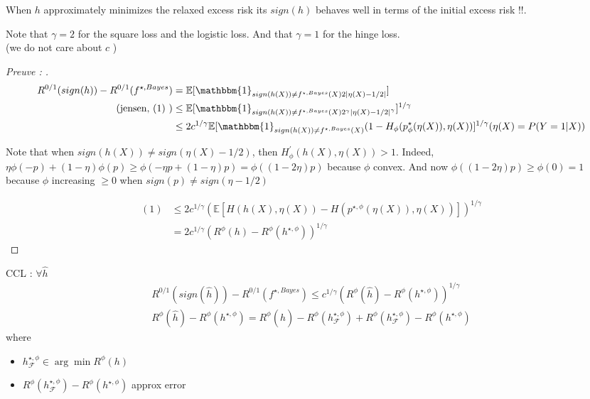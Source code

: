 When $ h $ approximately minimizes the relaxed excess risk its $ sign(h) $ behaves well in terms of the initial excess risk !!. 

\begin{note}[]
    Note that $ \gamma = 2 $  for the square loss and the logistic loss. And that $ \gamma = 1 $ for the hinge loss. \\
    (we do not care about $ c $ )
\end{note}

\begin{proof}[Preuve : ]
    \begin{align*}
        R^{0/1} (sign(h)) - R^{0/1}(f^{\star , Bayes }) &= \mathbb{E}[ \mathbbm{1}_{sign(h(X)) \neq  f^{\star , Bayes}(X) 2  \left| \eta (X) - 1/2 \right| }] \\
        \text{(jensen, (1) )} &\leq \mathbb{E}[ \mathbbm{1}_{sign(h(X)) \neq  f^{\star , Bayes}(X) 2^\gamma  \left| \eta (X) - 1/2 \right| ^\gamma }]^{1/\gamma } \\
                        &\leq 2 c^{1/\gamma } \mathbb{E}[\mathbbm{1}_{sign(h(X)) \neq  f^{\star , Bayes}(X) } (1 - H_ \phi (p^\star _\phi  (\eta (X)) , \eta (X))]^{1/\gamma} (\eta (X) = P (Y=1 | X))
    \end{align*}
    \begin{note}[]
        Note that when $ sign(h(X)) \neq sign(\eta (X) - 1/2) $, then $ H_\phi ^\prime ( h(X), \eta (X) ) > 1 $. Indeed, $ \eta \phi (-p) + (1 - \eta ) \phi (p) \geq \phi ( - \eta  p + (1 - \eta ) p) = \phi ((1 - 2 \eta ) p )$ because $ \phi  $ convex. And now $ \phi ((1 - 2 \eta ) p) \geq  \phi (0) = 1 $ because $ \phi  $ increasing $ \geq 0 $ when $ sign(p) \neq sign(\eta - 1/2) $ 
    \end{note}
    
    \begin{align*}
        (1) &\leq  2 c^{1/\gamma } ( \mathbb{E} [ H( h(X), \eta (X)) - H(p^{\star , \phi }(\eta (X)), \eta (X)) ])^{1/\gamma } \\ 
            &= 2c ^{1/\gamma } ( R^\phi (h) - R^\phi (h^{\star , \phi }) )^{1/\gamma }
    \end{align*}
    
\end{proof}

CCL : $ \forall \hat{h} $ 
\begin{align*}
    R^{0/1} ( sign(\hat{h}) ) - R^{0/1} (f^{\star , Bayes }) \leq c^{1/\gamma } ( R^\phi (\hat{h}) - R^\phi (h^{\star , \phi }))^{1/\gamma } \\
    R^\phi ( \hat{h} ) - R^\phi ( h^{\star , \phi } ) = R^\phi (\hat{h}) - R^\phi (h^{\star , \phi }_\mathcal{F} ) + R^\phi (h^{\star , \phi }_\mathcal{F}) - R^\phi ( h^{\star , \phi } ) 
\end{align*}
where \begin{itemize}
    \item $ h^{\star , \phi }_\mathcal{F} \in \arg \min R^\phi (h) $ 
    \item $ R^\phi (h^{\star , \phi }_\mathcal{F}) - R^\phi ( h^{\star , \phi } ) $  approx error
\end{itemize}



